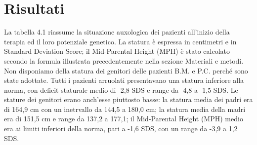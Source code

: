 \chapter{Risultati}

La tabella 4.1 riassume la situazione auxologica dei pazienti all'inizio della terapia ed il loro potenziale genetico. La statura è espressa in centimetri e in Standard Deviation Score; il Mid-Parental Height (MPH) è stato calcolato secondo la formula illustrata precedentemente nella sezione Materiali e metodi. Non disponiamo della statura dei genitori delle pazienti B.M. e P.C. perché sono state adottate. Tutti i pazienti arruolati presentavano una statura inferiore alla norma, con deficit staturale medio di -2,8 SDS e range da -4,8 a -1,5 SDS. Le stature dei genitori erano anch'esse piuttosto basse: la statura media dei padri era di 164,9 cm con un inetrvallo da 144,5 a 180,0 cm; la statura media della madri era di 151,5 cm e range da 137,2 a 177,1; il Mid-Parental Height (MPH) medio era ai limiti inferiori della norma, pari a -1,6 SDS, con un range da -3,9 a 1,2 SDS.

